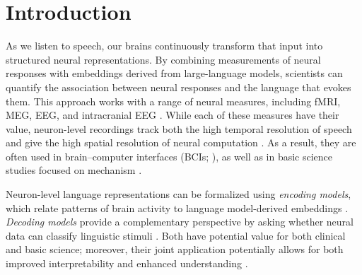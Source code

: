 \documentclass[pdflatex,sn-basic]{sn-jnl}%
\theoremstyle{thmstyleone}%
\theoremstyle{thmstyletwo}%
\theoremstyle{thmstylethree}%
\let\SNorigprintabstract\printabstract
\let\SNorigprintkeywords\printkeywords
\renewcommand{\printabstract}{}
\renewcommand{\printkeywords}{}
\begin{document}
\maketitle

\clearpage
\makeatletter
\SNorigprintabstract
\SNorigprintkeywords
\makeatother
\clearpage
\ifpreprintmode\linenumbers\fi
\section{Introduction}\label{sec1}

As we listen to speech, our brains continuously transform that input into
structured neural representations. By combining measurements of
neural responses with embeddings derived from large-language models, scientists
can quantify the association between neural responses and the language that
evokes them. This approach works with a range of neural measures, including
fMRI, MEG, EEG, and intracranial EEG \citep{bib1,bib2,bib3,bib4,bib5,bib9,bib10,bib11}.
While each of these measures have their value, neuron-level recordings track both
the high temporal resolution of speech and give the high spatial resolution of
neural computation \citep{bib13,bib14,bib4,bib5,bib12,bib48,bib49}. As a result, they are
often used in brain--computer interfaces (BCIs; \citealp{bib102,bib16,bib17}), as well as in
basic science studies focused on mechanism \citep[e.g.,][]{bib134}.

Neuron-level language representations can be formalized using \textit{encoding
models}, which relate patterns of brain activity to language model-derived
embeddings \citep{bib2,bib19,bib10,bib20,bib4,bib5,bib21,bib22}. \textit{Decoding
models} provide a complementary perspective by asking whether neural data can
classify linguistic stimuli \citep{bib23,bib2,bib24,bib25}. Both have potential
value for both clinical and basic science; moreover, their joint application
potentially allows for both improved interpretability and enhanced understanding \citep{bib68,bib135}.
\end{document}
